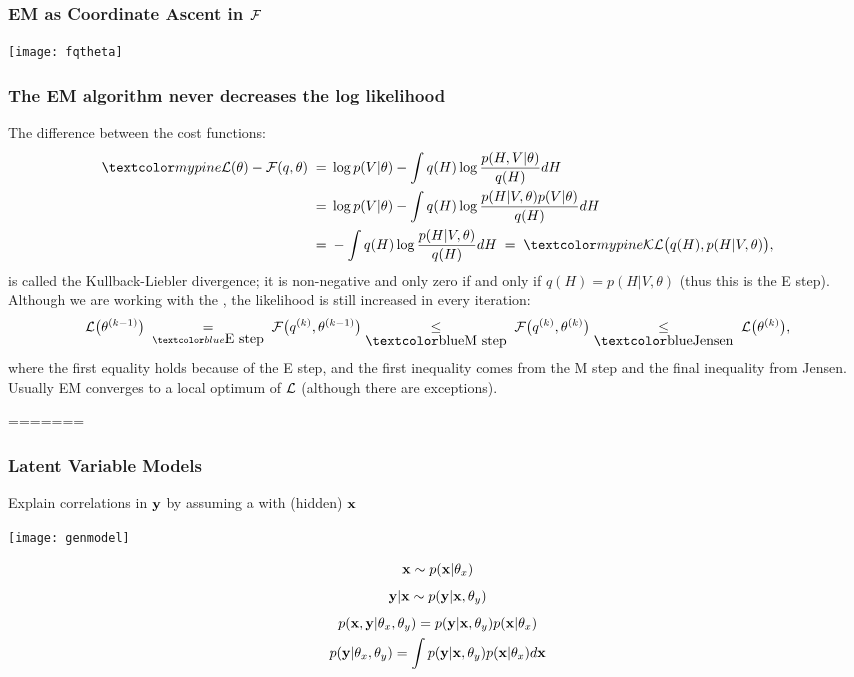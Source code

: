 \begin{frame}
\frametitle{EM as Coordinate Ascent in ${\cal F}$}

\centerline{\texttt{[image: fqtheta]}}
\end{frame}

\begin{frame}
\frametitle{The EM algorithm never decreases the log likelihood}

The difference between the cost functions:
%
\begin{equation*}
\begin{split}
\Green{{\cal L}(\theta)-{\cal F}(q,\theta)}\;=&\;\log p(V|\theta)
-\int q(H)\log\frac{p(H,V|\theta)}{q(H)}dH\\
=&\;\log p(V|\theta)-\int q(H)\log\frac{p(H|V,\theta)p(V|\theta)}{q(H)}dH\\
=&\;-\int q(H)\log\frac{p(H|V,\theta)}{q(H)}dH\;=\;
\Green{{\cal KL}\big(q(H),p(H|V,\theta)\big)},
\end{split}
\end{equation*}
%
is called the Kullback-Liebler divergence; it is non-negative and only
zero if and only if $q(H)=p(H|V,\theta)$ (thus this is the E
step). Although we are working with the , the
likelihood is still increased in every iteration:
%
\begin{equation*}
{\cal L}\big(\theta^{(k-1)}\big)\;
\underset{\Blue{\mbox{E step}}}{=}
\;{\cal F}\big(q^{(k)},\theta^{(k-1)}\big)
\underset{\mbox{\Blue{M step}}}{\leq}
\;{\cal F}\big(q^{(k)},\theta^{(k)}\big)
\underset{\mbox{\Blue{Jensen}}}{\leq}
\;{\cal L}\big(\theta^{(k)}\big),
\end{equation*}
where the first equality holds because of the E step, and the first inequality
comes from the M step and the final inequality from Jensen. Usually EM
converges to a local optimum of ${\cal L}$ (although there are exceptions).
\end{frame}


=======
\begin{frame}
\frametitle{Latent Variable Models}

Explain correlations in $\mathbf y$ by assuming a  with
 (hidden)  $\mathbf x$

\vfill 

\begin{minipage}{61mm}
\centerline{\texttt{[image: genmodel]}}
\end{minipage}
\begin{minipage}{61mm}
  \begin{gather*}
    \mathbf x \sim p(\mathbf x|\theta_x)\\[1ex]
    \mathbf y|\mathbf x \sim p(\mathbf y|\mathbf x,\theta_y) \\[1ex]
    p(\mathbf x,\mathbf y|\theta_x,\theta_y)=p(\mathbf y|\mathbf x,\theta_y)p(\mathbf x|\theta_x)\\
    p(\mathbf y | \theta_x, \theta_y) =
      \int p(\mathbf y | \mathbf x, \theta_y) p(\mathbf x | \theta_x)d \mathbf x
  \end{gather*}
\end{minipage}
\end{frame}

